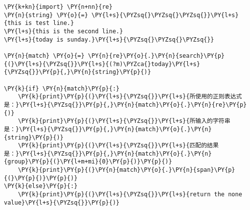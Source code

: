 \begin{Verbatim}[commandchars=\\\{\}]
\PY{k+kn}{import} \PY{n+nn}{re}
\PY{n}{string} \PY{o}{=} \PY{l+s}{\PYZsq{}\PYZsq{}\PYZsq{}}\PY{l+s}{this is test line.}
\PY{l+s}{this is the second line.}
\PY{l+s}{today is sunday.}\PY{l+s}{\PYZsq{}\PYZsq{}\PYZsq{}}

\PY{n}{match} \PY{o}{=} \PY{n}{re}\PY{o}{.}\PY{n}{search}\PY{p}{(}\PY{l+s}{\PYZsq{}}\PY{l+s}{(?m)\PYZca{}today}\PY{l+s}{\PYZsq{}}\PY{p}{,}\PY{n}{string}\PY{p}{)}

\PY{k}{if} \PY{n}{match}\PY{p}{:}
    \PY{k}{print}\PY{p}{(}\PY{l+s}{\PYZsq{}}\PY{l+s}{所使用的正则表达式是：}\PY{l+s}{\PYZsq{}}\PY{p}{,}\PY{n}{match}\PY{o}{.}\PY{n}{re}\PY{p}{)}
    \PY{k}{print}\PY{p}{(}\PY{l+s}{\PYZsq{}}\PY{l+s}{所输入的字符串是：}\PY{l+s}{\PYZsq{}}\PY{p}{,}\PY{n}{match}\PY{o}{.}\PY{n}{string}\PY{p}{)}
    \PY{k}{print}\PY{p}{(}\PY{l+s}{\PYZsq{}}\PY{l+s}{匹配的结果是：}\PY{l+s}{\PYZsq{}}\PY{p}{,}\PY{n}{match}\PY{o}{.}\PY{n}{group}\PY{p}{(}\PY{l+m+mi}{0}\PY{p}{)}\PY{p}{)}
    \PY{k}{print}\PY{p}{(}\PY{n}{match}\PY{o}{.}\PY{n}{span}\PY{p}{(}\PY{p}{)}\PY{p}{)}
\PY{k}{else}\PY{p}{:}
    \PY{k}{print}\PY{p}{(}\PY{l+s}{\PYZsq{}}\PY{l+s}{return the none value}\PY{l+s}{\PYZsq{}}\PY{p}{)}
\end{Verbatim}
